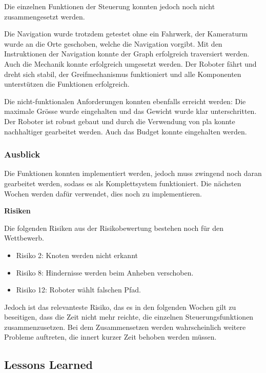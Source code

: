 Die einzelnen Funktionen der Steuerung konnten jedoch noch nicht zusammengesetzt werden.

Die Navigation wurde trotzdem getestet ohne ein Fahrwerk, der Kameraturm wurde an die Orte geschoben, welche die Navigation vorgibt. Mit den Instruktionen der Navigation konnte der Graph erfolgreich traversiert werden. Auch die Mechanik konnte erfolgreich umgesetzt werden. Der Roboter fährt und dreht sich stabil, der Greifmechanismus funktioniert und alle Komponenten unterstützen die Funktionen erfolgreich.

Die nicht-funktionalen Anforderungen konnten ebenfalls erreicht werden: Die maximale Grösse wurde eingehalten und das Gewicht wurde klar unterschritten. Der Roboter ist robust gebaut und durch die Verwendung von \acrshort{pla} konnte nachhaltiger gearbeitet werden. Auch das Budget konnte eingehalten werden.

\subsubsection{Ausblick}

Die Funktionen konnten implementiert werden, jedoch muss zwingend noch daran gearbeitet werden, sodass es als Komplettsystem funktioniert. Die nächsten Wochen werden dafür verwendet, dies noch zu implementieren.

\textbf{Risiken}

Die folgenden Risiken aus der Risikobewertung bestehen noch für den Wettbewerb. 

\begin{itemize}
    \item Risiko 2: Knoten werden nicht erkannt
    \item Risiko 8: Hindernisse werden beim Anheben verschoben.
    \item Risiko 12: Roboter wählt falschen Pfad.
\end{itemize}

Jedoch ist das relevanteste Risiko, das es in den folgenden Wochen gilt zu beseitigen, dass die Zeit nicht mehr reichte, die einzelnen Steuerungsfunktionen zusammenzusetzen.
Bei dem Zusammensetzen werden wahrscheinlich weitere Probleme auftreten, die innert kurzer Zeit behoben werden müssen.



\subsection{Lessons Learned}

